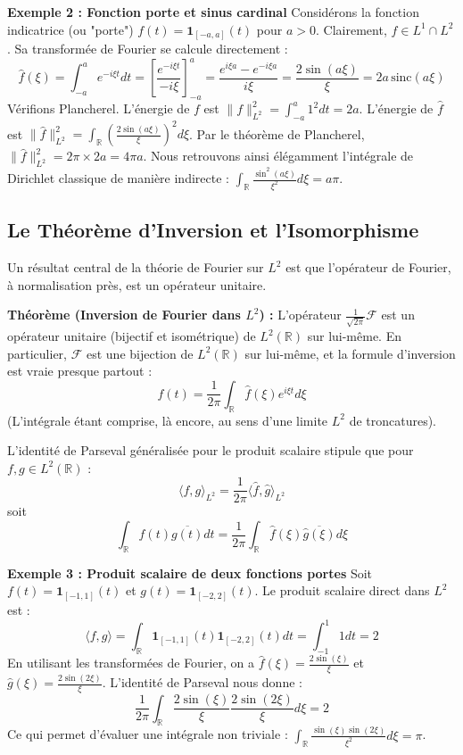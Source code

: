 \documentclass[11pt,a4paper]{article}
\begin{document}
\textbf{Exemple 2 : Fonction porte et sinus cardinal}
Considérons la fonction indicatrice (ou "porte") $f(t) = \mathbf{1}_{[-a, a]}(t)$ pour $a > 0$. Clairement, $f \in L^1 \cap L^2$.
Sa transformée de Fourier se calcule directement :
$$ \hat{f}(\xi) = \int_{-a}^{a} e^{-i\xi t} dt = \left[ \frac{e^{-i\xi t}}{-i\xi} \right]_{-a}^{a} = \frac{e^{i\xi a} - e^{-i\xi a}}{i\xi} = \frac{2\sin(a\xi)}{\xi} = 2a \, \text{sinc}(a\xi) $$
Vérifions Plancherel.
L'énergie de $f$ est $\|f\|_{L^2}^2 = \int_{-a}^{a} 1^2 dt = 2a$.
L'énergie de $\hat{f}$ est $\|\hat{f}\|_{L^2}^2 = \int_{\mathbb{R}} \left( \frac{2\sin(a\xi)}{\xi} \right)^2 d\xi$.
Par le théorème de Plancherel, $\|\hat{f}\|_{L^2}^2 = 2\pi \times 2a = 4\pi a$.
Nous retrouvons ainsi élégamment l'intégrale de Dirichlet classique de manière indirecte : $\int_{\mathbb{R}} \frac{\sin^2(a\xi)}{\xi^2} d\xi = a\pi$.

\subsection*{Le Théorème d'Inversion et l'Isomorphisme}

Un résultat central de la théorie de Fourier sur $L^2$ est que l'opérateur de Fourier, à normalisation près, est un opérateur unitaire.

\textbf{Théorème (Inversion de Fourier dans $L^2$) :}
L'opérateur $\frac{1}{\sqrt{2\pi}}\mathcal{F}$ est un opérateur unitaire (bijectif et isométrique) de $L^2(\mathbb{R})$ sur lui-même.
En particulier, $\mathcal{F}$ est une bijection de $L^2(\mathbb{R})$ sur lui-même, et la formule d'inversion est vraie presque partout :
$$ f(t) = \frac{1}{2\pi} \int_{\mathbb{R}} \hat{f}(\xi) e^{i\xi t} d\xi $$
(L'intégrale étant comprise, là encore, au sens d'une limite $L^2$ de troncatures).

L'identité de Parseval généralisée pour le produit scalaire stipule que pour $f, g \in L^2(\mathbb{R})$ :
$$ \langle f, g \rangle_{L^2} = \frac{1}{2\pi} \langle \hat{f}, \hat{g} \rangle_{L^2} $$
soit
$$ \int_{\mathbb{R}} f(t) \overline{g(t)} dt = \frac{1}{2\pi} \int_{\mathbb{R}} \hat{f}(\xi) \overline{\hat{g}(\xi)} d\xi $$

\textbf{Exemple 3 : Produit scalaire de deux fonctions portes}
Soit $f(t) = \mathbf{1}_{[-1, 1]}(t)$ et $g(t) = \mathbf{1}_{[-2, 2]}(t)$.
Le produit scalaire direct dans $L^2$ est :
$$ \langle f, g \rangle = \int_{\mathbb{R}} \mathbf{1}_{[-1, 1]}(t) \mathbf{1}_{[-2, 2]}(t) dt = \int_{-1}^{1} 1 dt = 2 $$
En utilisant les transformées de Fourier, on a $\hat{f}(\xi) = \frac{2\sin(\xi)}{\xi}$ et $\hat{g}(\xi) = \frac{2\sin(2\xi)}{\xi}$.
L'identité de Parseval nous donne :
$$ \frac{1}{2\pi} \int_{\mathbb{R}} \frac{2\sin(\xi)}{\xi} \frac{2\sin(2\xi)}{\xi} d\xi = 2 $$
Ce qui permet d'évaluer une intégrale non triviale : $\int_{\mathbb{R}} \frac{\sin(\xi)\sin(2\xi)}{\xi^2} d\xi = \pi$.
\end{document}
